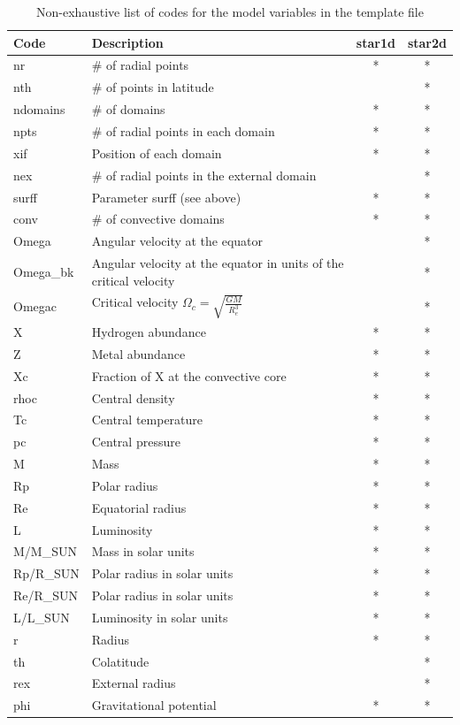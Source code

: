 \begin{longtable}{|l|p{8cm}|c|c|}
\caption{Non-exhaustive list of codes for the model variables in the template file}\\
\hline
\bf Code&\bf Description&\bf star1d&\bf star2d\\
\hline\hline
nr&\# of radial points&*&*\\
\hline
nth&\# of points in latitude&&*\\
\hline
ndomains&\# of domains&*&*\\
\hline
npts&\# of radial points in each domain&*&*\\
\hline
xif&Position of each domain&*&*\\
\hline
nex&\# of radial points in the external domain&&*\\
\hline
surff&Parameter surff (see above)&*&*\\
\hline
conv&\# of convective domains&*&*\\
\hline
Omega&Angular velocity at the equator&&*\\
\hline
Omega\_bk&Angular velocity at the equator in units of the critical velocity&&*\\
\hline
Omegac&Critical velocity $\Omega_c=\sqrt{\frac{GM}{R_e^3}}$&&*\\
\hline
X&Hydrogen abundance&*&*\\
\hline
Z&Metal abundance&*&*\\
\hline
Xc&Fraction of X at the convective core&*&*\\
\hline
rhoc&Central density&*&*\\
\hline
Tc&Central temperature&*&*\\
\hline
pc&Central pressure&*&*\\
\hline
M&Mass&*&*\\
\hline
Rp&Polar radius&*&*\\
\hline
Re&Equatorial radius&*&*\\
\hline
L&Luminosity&*&*\\
\hline
M/M\_SUN&Mass in solar units&*&*\\
\hline
Rp/R\_SUN&Polar radius in solar units&*&*\\
\hline
Re/R\_SUN&Polar radius in solar units&*&*\\
\hline
L/L\_SUN&Luminosity in solar units&*&*\\
\hline
r&Radius&*&*\\
\hline
th&Colatitude&&*\\
\hline
rex&External radius&&*\\
\hline
phi&Gravitational potential&*&*\\

\end{longtable}
